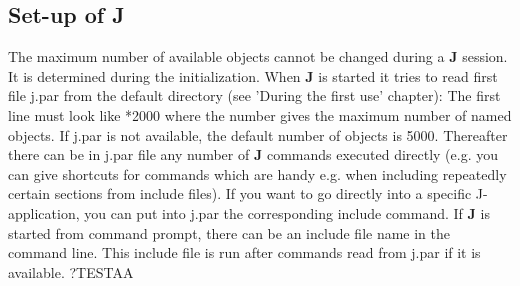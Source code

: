 \subsection{Set-up of \textbf{J}}
\label{setup}
The maximum number of available objects cannot be changed during a \textbf{J} session. It is determined during
the initialization. When \textbf{J} is started it tries to read first file j.par from the default directory
(see 'During the first use' chapter): The first line must look like
*2000
where the number gives the maximum number of named objects.  If j.par is not available, the default
number of objects is 5000.
Thereafter there can be in j.par file any number of \textbf{J} commands executed directly (e.g.
you can give shortcuts for
commands which are handy e.g. when including repeatedly certain sections from include files). If you
want to go directly into a specific J-application, you can put into j.par the corresponding include
command.
If \textbf{J} is started from command prompt, there can be an include file name in the command line. This
include file is run after commands read from j.par if it is available.  ?TESTAA
